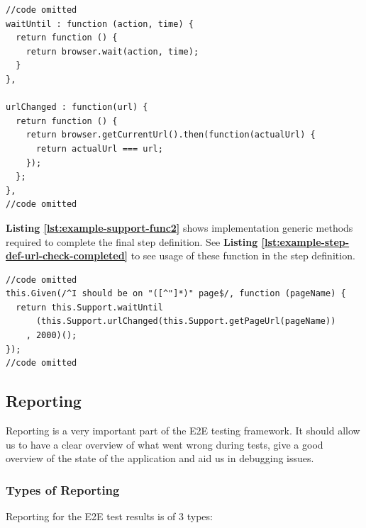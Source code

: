 \begin{listing}[H]
\begin{verbatim}
//code omitted
waitUntil : function (action, time) {
  return function () {
    return browser.wait(action, time);
  }
},

urlChanged : function(url) {
  return function () {
    return browser.getCurrentUrl().then(function(actualUrl) {
      return actualUrl === url;
    });
  };
},
//code omitted
\end{verbatim}
\label{lst:example-support-func2}
\end{listing}

\textbf{Listing \ref{lst:example-support-func2}} shows implementation generic methods required to complete the final step definition. See \textbf{Listing \ref{lst:example-step-def-url-check-completed}} to see usage of these function in the step definition.

\begin{listing}[H]
\begin{verbatim}
//code omitted
this.Given(/^I should be on "([^"]*)" page$/, function (pageName) {
  return this.Support.waitUntil
      (this.Support.urlChanged(this.Support.getPageUrl(pageName))
    , 2000)();
});
//code omitted
\end{verbatim}
\label{lst:example-step-def-url-check-completed}
\end{listing}

\subsection{Reporting}
\label{subsec:reporting}

Reporting is a very important part of the E2E testing framework. It should allow us to have a clear overview of what went wrong during tests, give a good overview of the state of the application and aid us in debugging issues.

\subsubsection{Types of Reporting}
\label{subsubsec:types-of-reporting}

Reporting for the E2E test results is of 3 types:

